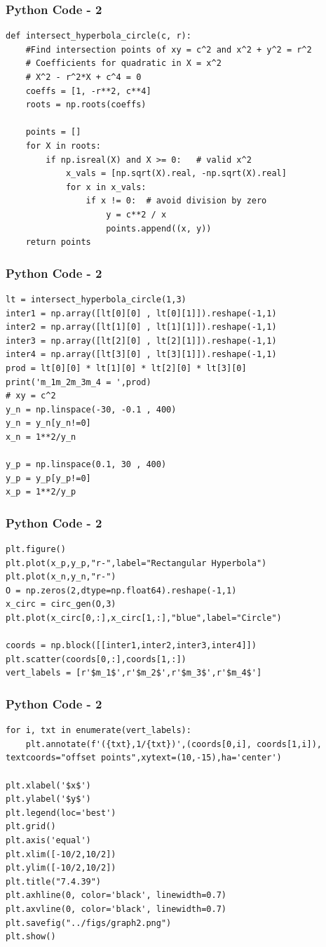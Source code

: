 \documentclass{beamer}
\begin{document}
\begin{frame}[fragile]
    \frametitle{Python Code - 2}
    \begin{lstlisting}
def intersect_hyperbola_circle(c, r):
    #Find intersection points of xy = c^2 and x^2 + y^2 = r^2
    # Coefficients for quadratic in X = x^2
    # X^2 - r^2*X + c^4 = 0
    coeffs = [1, -r**2, c**4]
    roots = np.roots(coeffs)

    points = []
    for X in roots:
        if np.isreal(X) and X >= 0:   # valid x^2
            x_vals = [np.sqrt(X).real, -np.sqrt(X).real]
            for x in x_vals:
                if x != 0:  # avoid division by zero
                    y = c**2 / x
                    points.append((x, y))
    return points

\end{lstlisting}
\end{frame}

\begin{frame}[fragile]
    \frametitle{Python Code - 2}
    \begin{lstlisting}
lt = intersect_hyperbola_circle(1,3)
inter1 = np.array([lt[0][0] , lt[0][1]]).reshape(-1,1)
inter2 = np.array([lt[1][0] , lt[1][1]]).reshape(-1,1)
inter3 = np.array([lt[2][0] , lt[2][1]]).reshape(-1,1)
inter4 = np.array([lt[3][0] , lt[3][1]]).reshape(-1,1)
prod = lt[0][0] * lt[1][0] * lt[2][0] * lt[3][0] 
print('m_1m_2m_3m_4 = ',prod)
# xy = c^2 
y_n = np.linspace(-30, -0.1 , 400)
y_n = y_n[y_n!=0]
x_n = 1**2/y_n 
 
y_p = np.linspace(0.1, 30 , 400)
y_p = y_p[y_p!=0]
x_p = 1**2/y_p
\end{lstlisting}
\end{frame}
\begin{frame}[fragile]
    \frametitle{Python Code - 2}
    \begin{lstlisting}
plt.figure()
plt.plot(x_p,y_p,"r-",label="Rectangular Hyperbola")
plt.plot(x_n,y_n,"r-")
O = np.zeros(2,dtype=np.float64).reshape(-1,1)
x_circ = circ_gen(O,3)
plt.plot(x_circ[0,:],x_circ[1,:],"blue",label="Circle")

coords = np.block([[inter1,inter2,inter3,inter4]])
plt.scatter(coords[0,:],coords[1,:])
vert_labels = [r'$m_1$',r'$m_2$',r'$m_3$',r'$m_4$']
\end{lstlisting}
\end{frame}
\begin{frame}[fragile]
    \frametitle{Python Code - 2}
    \begin{lstlisting}
for i, txt in enumerate(vert_labels):
    plt.annotate(f'({txt},1/{txt})',(coords[0,i], coords[1,i]),            textcoords="offset points",xytext=(10,-15),ha='center')

plt.xlabel('$x$')
plt.ylabel('$y$')
plt.legend(loc='best')
plt.grid() 
plt.axis('equal')
plt.xlim([-10/2,10/2])
plt.ylim([-10/2,10/2])
plt.title("7.4.39")
plt.axhline(0, color='black', linewidth=0.7)
plt.axvline(0, color='black', linewidth=0.7)
plt.savefig("../figs/graph2.png")
plt.show()
\end{lstlisting}
\end{frame}
\end{document}
